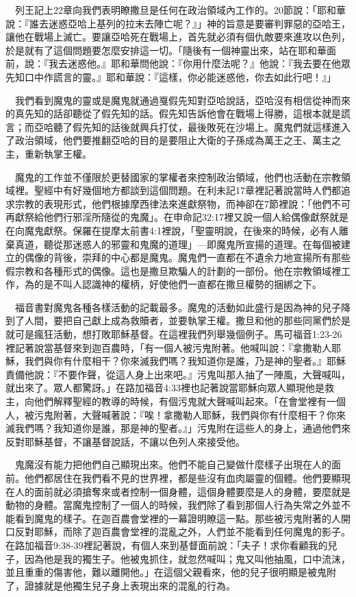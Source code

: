 \documentclass{book}
\begin{document}
　列王記上22章向我們表明瞭撒旦是任何在政治領域內工作的。20節說：「耶和華說：『誰去迷惑亞哈上基列的拉末去陣亡呢？』」神的旨意是要審判罪惡的亞哈王，讓他在戰場上滅亡。要讓亞哈死在戰場上，首先就必須有個仇敵要來進攻以色列，於是就有了這個問題要怎麼安排這一切。「隨後有一個神靈出來，站在耶和華面前，說：『我去迷惑他。』耶和華問他說：『你用什麼法呢？』他說：『我去要在他眾先知口中作謊言的靈。』耶和華說：『這樣，你必能迷惑他，你去如此行吧！』」

　我們看到魔鬼的靈或是魔鬼就通過戛假先知對亞哈說話，亞哈沒有相信從神而來的真先知的話卻聽從了假先知的話。假先知告訴他會在戰場上得勝，這根本就是謊言；而亞哈聽了假先知的話後就興兵打仗，最後敗死在沙場上。魔鬼們就這樣進入了政治領域，他們要推翻亞哈的目的是要阻止大衛的子孫成為萬王之王、萬主之主，重新執掌王權。

　魔鬼的工作並不僅限於更替國家的掌權者來控制政治領域，他們也活動在宗教領域裡。聖經中有好幾個地方都談到這個問題。在利未記17章裡記著說當時人們都追求宗教的表現形式，他們根據摩西律法來進獻祭物，而神卻在7節裡說：「他們不可再獻祭給他們行邪淫所隨從的鬼魔」。在申命記32:17裡又說一個人給偶像獻祭就是在向魔鬼獻祭。保羅在提摩太前書4:1裡說，「聖靈明說，在後來的時候，必有人離棄真道，聽從那迷惑人的邪靈和鬼魔的道理」---即魔鬼所宣揚的道理。在每個被建立的偶像的背後，崇拜的中心都是魔鬼。魔鬼們一直都在不遺余力地宣揚所有那些假宗教和各種形式的偶像。這也是撒旦欺騙人的計劃的一部份。他在宗教領域裡工作，為的是不叫人認識神的權柄，好使他們一直都在撒旦權勢的捆綁之下。

　福音書對魔鬼各種各樣活動的記載最多。魔鬼的活動如此盛行是因為神的兒子降到了人間，要把自己獻上成為救贖者，並要執掌王權。撒旦和他的那些同黨們於是就可是瘋狂活動，想打敗耶穌基督。在這裡我們列舉幾個例子。馬可福音1:23-26裡記著說當基督來到迦百農時，「有一個人被污鬼附著。他喊叫說：『拿撒勒人耶穌，我們與你有什麼相干？你來滅我們嗎？我知道你是誰，乃是神的聖者。』耶穌責備他說：『不要作聲，從這人身上出來吧。』污鬼叫那人抽了一陣風，大聲喊叫，就出來了。眾人都驚訝。」在路加福音4:33裡也記著說當耶穌向眾人顯現他是救主，向他們解釋聖經的教導的時候，有個污鬼就大聲喊叫起來。「在會堂裡有一個人，被污鬼附著，大聲喊著說：『唉！拿撒勒人耶穌，我們與你有什麼相干？你來滅我們嗎？我知道你是誰，那是神的聖者。』」污鬼附在這些人的身上，通過他們來反對耶穌基督，不讓基督說話，不讓以色列人來接受他。

　鬼魔沒有能力把他們自己顯現出來。他們不能自己變做什麼樣子出現在人的面前。他們都居住在我們看不見的世界裡，都是些沒有血肉屬靈的個體。他們要顯現在人的面前就必須搶奪來或者控制一個身體，這個身體要麼是人的身體，要麼就是動物的身體。當魔鬼控制了一個人的時候，我們除了看到那個人行為失常之外並不能看到魔鬼的樣子。在迦百農會堂裡的一幕證明瞭這一點。那些被污鬼附著的人開口反對耶穌，而除了迦百農會堂裡的混亂之外，人們並不能看到任何魔鬼的影子。在路加福音9:38-39裡記著說，有個人來到基督面前說：「夫子！求你看顧我的兒子，因為他是我的獨生子。他被鬼抓住，就忽然喊叫；鬼又叫他抽風，口中流沫，並且重重的傷害他，難以離開他。」在這個父親看來，他的兒子很明顯是被鬼附了，證據就是他獨生兒子身上表現出來的混亂的行為。
\end{document}
